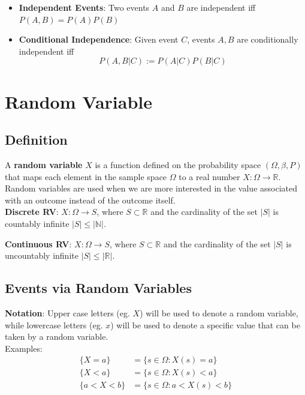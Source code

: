 \documentclass{report}
\begin{document}
\begin{itemize}
\begin{itemize}
\begin{center}
                \end{center}
        \end{itemize}
  \item \textbf{Independent Events}: Two events $A$ and $B$ are independent iff $P(A,B) = P(A)P(B)$
  \item \textbf{Conditional Independence}: Given event $C$, events $A,B$ are conditionally independent iff $$P(A,B|C) := P(A|C)P(B|C)$$
\end{itemize}

\chapter{Random Variable}
\section{Definition}

\noindent A \textbf{random variable} $X$ is a function defined on the probability space $(\Omega,\beta,P)$ that maps each element in the sample space $\Omega$ to a real number $X: \Omega \rightarrow \mathbb{R}$. Random variables are used when we are more interested in the value associated with an outcome instead of the outcome itself. \\

\noindent \textbf{Discrete RV}: $X: \Omega \rightarrow S$, where $S \subset \mathbb{R}$ and the cardinality of the set $|S|$ is countably infinite $|S| \leq |\mathbb{N}|$.

\noindent \textbf{Continuous RV}: $X: \Omega \rightarrow S$, where $S \subset \mathbb{R}$ and the cardinality of the set $|S|$ is uncountably infinite $|S| \leq |\mathbb{R}|$.

\section{Events via Random Variables}

\noindent \textbf{Notation}: Upper case letters (eg. $X$) will be used to denote a random variable, while lowercase letters (eg. $x$) will be used to denote a specific value that can be taken by a random variable. \\

\noindent Examples:
\begin{align*}
  \{X = a\}     & = \{ s \in \Omega : X(s) = a \}     \\
  \{X < a\}     & = \{ s \in \Omega : X(s) < a \}     \\
  \{a < X < b\} & = \{ s \in \Omega : a < X(s) < b \}
\end{align*}
\end{document}
